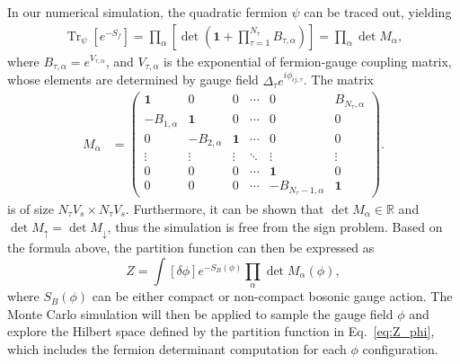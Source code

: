 \documentclass[aps,prl,twocolumn,superscriptaddress,showpacs,longbibliography]{revtex4-2}
\begin{document}
In our numerical simulation, the quadratic fermion $\psi$ can be traced out, yielding
\begin{align}
  \operatorname{Tr}_\psi\left[e^{-S_f}\right]
  =\prod_\alpha\left[\operatorname{det}\left(\mathbf{1}+\prod_{\tau=1}^{N_\tau} B_{\tau,\alpha}\right)\right]=\prod_\alpha\operatorname{det}M_\alpha,
\label{eq:eq4}
\end{align}
where $B_{\tau,\alpha}=e^{V_{\tau,\alpha}}$, and $V_{\tau,\alpha}$ is the exponential of
fermion-gauge coupling matrix, whose elements are determined by gauge field $\Delta_\tau e^{i\phi_{ij, \tau}}$.
The matrix 
\begin{align}
M_\alpha &=
\begin{pmatrix}
\mathbf{1} & 0 & 0 & \cdots & 0 & B_{N_\tau,\alpha} \\
-B_{1,\alpha} & \mathbf{1} & 0 & \cdots & 0 & 0 \\
0 & -B_{2,\alpha} & \mathbf{1} &\cdots & 0 & 0 \\
\vdots & \vdots & \vdots & \ddots & \vdots & \vdots \\
0& 0 & 0 & \cdots & \mathbf{1} & 0 \\
0 & 0 & 0 & \cdots &-B_{N_{\tau}-1,\alpha} & \mathbf{1}
\end{pmatrix}. \label{eq:M_alpha}
\end{align}
is of size $N_{\tau} V_s  \times N_\tau V_s $.
Furthermore, it can be shown \cite{XYXuU12018} that
$\operatorname{det}M_\alpha\in \mathbb{R}$ and
$\operatorname{det}M_\uparrow=\operatorname{det}M_\downarrow$, thus the simulation is free from the sign problem.
Based on the formula above, the partition function can then be expressed as
\begin{equation}
Z=\int\left[\delta \phi \right] e^{-S_B(\phi)} \prod_\alpha\operatorname{det}M_\alpha(\phi), \label{eq:Z_phi}
\end{equation}
where $S_B(\phi)$ can be either compact or non-compact bosonic gauge action. The Monte Carlo simulation will then be applied to sample the gauge field $\phi$ and explore the Hilbert space defined by the partition function in Eq.~\eqref{eq:Z_phi}, which includes the fermion determinant computation for each $\phi$ configuration.\\
\end{document}
